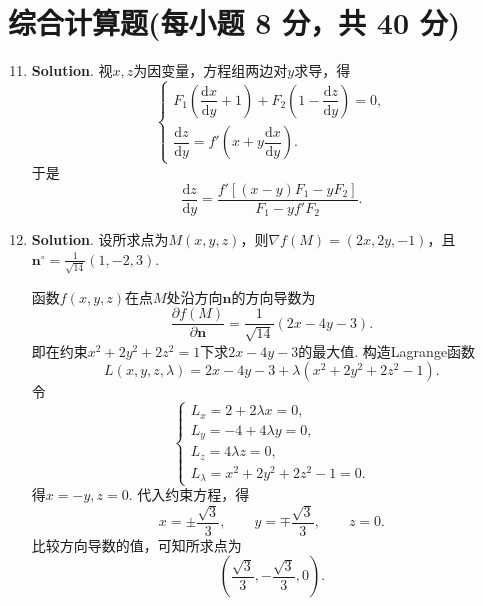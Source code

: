 \documentclass[../main.tex]{subfiles}
\begin{document}
\section{综合计算题(每小题 8 分，共 40 分)}
\begin{enumerate}
    \setcounter{enumi}{10}
    \item \textbf{Solution}. 视$x,z$为因变量，方程组两边对$y$求导，得
          \[
              \begin{cases}
                  F_{1}\left(\dfrac{\mathrm{d}x}{\mathrm{d}y}+1\right)
                  +F_{2}\left(1-\dfrac{\mathrm{d}z}{\mathrm{d}y}\right)=0, \\[8pt]
                  \dfrac{\mathrm{d}z}{\mathrm{d}y}=f'\left(x+y\dfrac{\mathrm{d}x}{\mathrm{d}y}\right).
              \end{cases}
          \]
          于是
          \[
              \frac{\mathrm{d}z}{\mathrm{d}y}
              =\frac{f'\left[(x-y)F_{1}-yF_{2}\right]}{F_{1}-yf'F_{2}}.
          \]

    \item \textbf{Solution}. 设所求点为$M(x,y,z)$，则$\nabla f(M)=(2x,2y,-1)$，且
          $\boldsymbol{n}^{\circ}=\frac{1}{\sqrt{14}}(1,-2,3)$.

          函数$f(x,y,z)$在点$M$处沿方向$\boldsymbol{n}$的方向导数为
          \[
              \frac{\partial f(M)}{\partial \boldsymbol{n}}
              =\frac{1}{\sqrt{14}}(2x-4y-3).
          \]
          即在约束$x^{2}+2y^{2}+2z^{2}=1$下求$2x-4y-3$的最大值. 构造Lagrange函数
          \[
              L(x,y,z,\lambda)=2x-4y-3+\lambda(x^{2}+2y^{2}+2z^{2}-1).
          \]
          令
          \[
              \begin{cases}
                  L_{x}=2+2\lambda x=0,  \\
                  L_{y}=-4+4\lambda y=0, \\
                  L_{z}=4\lambda z=0,    \\
                  L_{\lambda}=x^{2}+2y^{2}+2z^{2}-1=0.
              \end{cases}
          \]
          得$x=-y,z=0$. 代入约束方程，得
          \[
              x=\pm\frac{\sqrt3}{3},\qquad y=\mp\frac{\sqrt3}{3},\qquad z=0.
          \]
          比较方向导数的值，可知所求点为
          \[
              \left(\frac{\sqrt3}{3},-\frac{\sqrt3}{3},0\right).
          \]


\end{enumerate}
\end{document}
